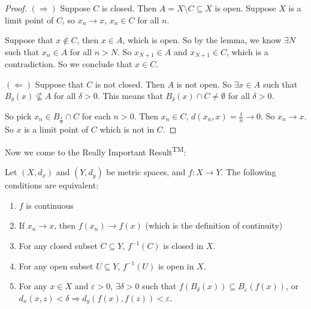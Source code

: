 \documentclass[a4paper]{article}
\begin{document}
\begin{proof}
  $(\Rightarrow)$  Suppose $C$ is closed. Then $A = X\setminus C\subseteq X$ is open. Suppose $X$ is a limit point of $C$, so $x_n \to x$, $x_n \in C$ for all $n$.

  Suppose that $x\not\in C$, then $x\in A$, which is open. So by the lemma, we know $\exists N$ such that $x_n \in A$ for all $n > N$. So $x_{N + 1} \in A$ and $x_{N + 1} \in C$, which is a contradiction. So we conclude that $x\in C$.

  $(\Leftarrow)$ Suppose that $C$ is not closed. Then $A$ is not open. So $\exists x\in A$ such that $B_\delta(x)\not\subseteq A$ for all $\delta > 0$. This means that $B_\delta(x) \cap C \not= \emptyset$ for all $\delta > 0$.
  
  So pick $x_n \in B_{\frac{1}{n}}\cap C$ for each $n > 0$. Then $x_n \in C$, $d(x_n, x) = \frac{1}{n} \to 0$. So $x_n \to x$. So $x$ is a limit point of $C$ which is not in $C$.
\end{proof}

Now we come to the Really Important Result\textsuperscript{TM}:
\begin{prop}
  Let $(X, d_x)$ and $(Y, d_y)$ be metric spaces, and $f: X\to Y$. The following conditions are equivalent:
  \begin{enumerate}
    \item $f$ is continuous
    \item If $x_n \to x$, then $f(x_n) \to f(x)$ (which is the definition of continuity)
    \item For any closed subset $C\subseteq Y$, $f^{-1}(C)$ is closed in $X$.
    \item For any open subset $U\subseteq Y$, $f^{-1}(U)$ is open in $X$.
    \item For any $x\in X$ and $\varepsilon > 0$, $\exists \delta > 0$ such that $f(B_\delta(x)) \subseteq B_\varepsilon(f(x))$, or $d_x(x, z) < \delta \Rightarrow d_y(f(x), f(z)) < \varepsilon$.
  \end{enumerate}
\end{prop}
\end{document}
